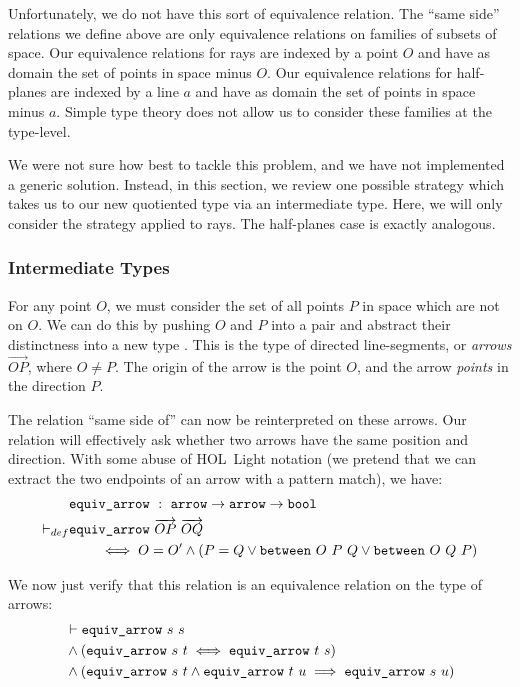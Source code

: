 Unfortunately, we do not have this sort of equivalence relation. The ``same side'' relations we define above are only equivalence relations on families of subsets of space. Our equivalence relations for rays are indexed by a point $O$ and have as domain the set of points in space minus $O$. Our equivalence relations for half-planes are indexed by a line $a$ and have as domain the set of points in space minus $a$. Simple type theory does not allow us to consider these families at the type-level.

We were not sure how best to tackle this problem, and we have not implemented a generic solution. Instead, in this section, we review one possible strategy which takes us to our new quotiented type via an intermediate type. Here, we will only consider the strategy applied to rays. The half-planes case is exactly analogous.

\subsubsection{Intermediate Types}
For any point $O$, we must consider the set of all points $P$ in space which are not on $O$. We can do this by pushing $O$ and $P$ into a pair and abstract their distinctness into a new type . This is the type of directed line-segments, or \emph{arrows} $\overrightarrow{OP}$, where $O \neq P$. The origin of the arrow is the point $O$, and the arrow \emph{points} in the direction $P$.

The relation ``same side of'' can now be reinterpreted on these arrows. Our relation will effectively ask whether two arrows have the same position and direction. With some abuse of HOL~Light notation (we pretend that we can extract the two endpoints of an arrow with a pattern match), we have:
\begin{equation}\label{eq:EquivArrowDef}
  \begin{split}
    &\code{equiv\_arrow}\ :\ \code{arrow} \rightarrow \code{arrow}\rightarrow \code{bool}\\
    \vdash_{def} &\code{equiv\_arrow}\ \overrightarrow{OP}\ \overrightarrow{OQ}\\
    &\qquad\iff O = O' \wedge (P = Q \vee \between{O}{P}{Q} \vee \between{O}{Q}{P})
  \end{split}
\end{equation}

We now just verify that this relation is an equivalence relation on the type of arrows:
\begin{equation*}
  \begin{split}
    &\vdash\code{equiv\_arrow}\ s\ s\\
    &\wedge (\code{equiv\_arrow}\ s\ t \iff \code{equiv\_arrow}\ t\ s)\\
    &\wedge (\code{equiv\_arrow}\ s\ t \wedge \code{equiv\_arrow}\ t\ u \implies\code{equiv\_arrow}\ s\ u)
  \end{split}
\end{equation*}

